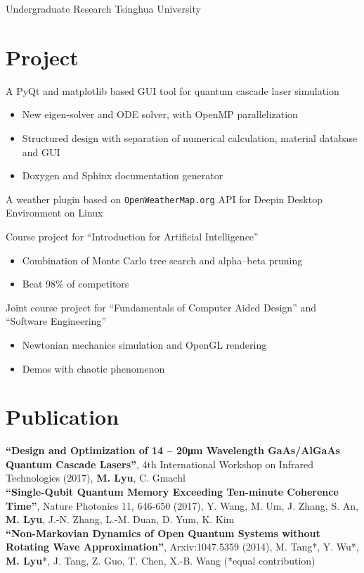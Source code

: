 \documentclass[11pt,letterpaper]{resume}
\begin{document}
Undergraduate Research \hfill Tsinghua University

\section{Project}
A PyQt and matplotlib based GUI tool for quantum cascade laser simulation
\begin{itemize}
    \item New eigen-solver and ODE solver, with OpenMP parallelization
    \item Structured design with separation of numerical calculation, 
    material database and GUI
    \item Doxygen and Sphinx documentation generator
\end{itemize}\medskip

A weather plugin based on \texttt{OpenWeatherMap.org} API for Deepin Desktop Environment on Linux\medskip

Course project for ``Introduction for Artificial Intelligence''
\begin{itemize}
    \item Combination of Monte Carlo tree search and alpha–beta pruning
    \item Beat 98\% of competitors
\end{itemize}\medskip

Joint course project for ``Fundamentals of Computer Aided Design'' and 
``Software Engineering''
\begin{itemize}
    \item Newtonian mechanics simulation and OpenGL rendering
    \item Demos with chaotic phenomenon
\end{itemize}

\section{Publication}
\textbf{``Design and Optimization of 14 -- 20\si{\micro m} Wavelength 
GaAs/AlGaAs Quantum Cascade Lasers''}, 
4th International Workshop on Infrared Technologies (2017), 
\textbf{M. Lyu}, C. Gmachl \\
\textbf{``Single-Qubit Quantum Memory Exceeding Ten-minute Coherence Time''}, 
Nature Photonics 11, 646-650 (2017), Y. Wang, M. Um, J. Zhang, S. An, 
\textbf{M. Lyu}, J.-N. Zhang, L.-M. Duan, D. Yum, K. Kim \\
\textbf{``Non-Markovian Dynamics of Open Quantum Systems without Rotating 
Wave Approximation''}, 
Arxiv:1047.5359 (2014), 
M. Tang*, Y. Wu*, \textbf{M. Lyu}*, J. Tang, Z. Guo, T. Chen, X.-B. Wang  
(*equal contribution)
\end{document}
